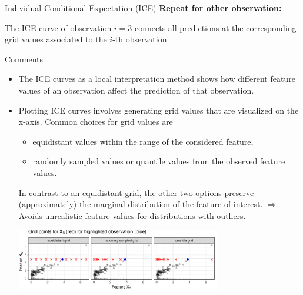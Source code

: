 \documentclass[11pt,compress,t,notes=noshow, xcolor=table]{beamer}
\begin{document}
\begin{vbframe}{Individual Conditional Expectation (ICE)}
\textbf{Repeat for other observation:}

The ICE curve of observation $i=3$ connects all predictions at the corresponding grid values associated to the $i$-th observation.
\end{vbframe}


\begin{vbframe}{Comments}
\begin{itemize}
\item The ICE curves as a local interpretation method shows how different feature values of an observation affect the prediction of that observation.
\item Plotting ICE curves involves generating grid values that are visualized on the x-axis.
Common choices for grid values are
\begin{itemize}
\item equidistant values within the range of the considered feature,
\item randomly sampled values or quantile values from the observed feature values.
\end{itemize}
In contrast to an equidistant grid, the other two options preserve (approximately) the marginal distribution of the feature of interest.
$\Rightarrow$ Avoids unrealistic feature values for distributions with outliers.

\vspace{1pt}
\centering
\includegraphics[width=0.7\textwidth, trim=0cm 0cm 0cm 0cm, clip]{figure_man/sampling}

\end{itemize}
\end{vbframe}

\endlecture
\end{document}
